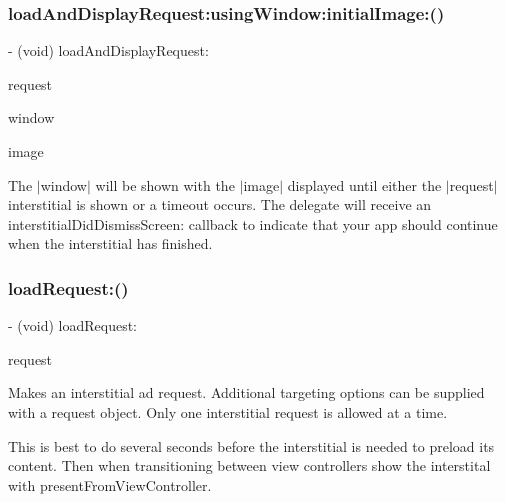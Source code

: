 \subsubsection{\texorpdfstring{load\+And\+Display\+Request\+:using\+Window\+:initial\+Image\+:()}{loadAndDisplayRequest:usingWindow:initialImage:()}}
{\footnotesize\ttfamily -\/ (void) load\+And\+Display\+Request\+: \begin{DoxyParamCaption}\item[{(\hyperlink{interfaceGADRequest}{G\+A\+D\+Request} $\ast$)}]{request }\item[{usingWindow:(U\+I\+Window $\ast$)}]{window }\item[{initialImage:(U\+I\+Image $\ast$)}]{image }\end{DoxyParamCaption}}

The $\vert$window$\vert$ will be shown with the $\vert$image$\vert$ displayed until either the $\vert$request$\vert$ interstitial is shown or a timeout occurs. The delegate will receive an interstitial\+Did\+Dismiss\+Screen\+: callback to indicate that your app should continue when the interstitial has finished. \mbox{\label{interfaceGADInterstitial_aa469fd3d2e59b8bd9d8f69cfaa28dbf3}} 
\subsubsection{\texorpdfstring{load\+Request\+:()}{loadRequest:()}}
{\footnotesize\ttfamily -\/ (void) load\+Request\+: \begin{DoxyParamCaption}\item[{(\hyperlink{interfaceGADRequest}{G\+A\+D\+Request} $\ast$)}]{request }\end{DoxyParamCaption}}

Makes an interstitial ad request. Additional targeting options can be supplied with a request object. Only one interstitial request is allowed at a time.

This is best to do several seconds before the interstitial is needed to preload its content. Then when transitioning between view controllers show the interstital with present\+From\+View\+Controller. \mbox{\label{interfaceGADInterstitial_ac002c3a84433c3e56e4cc356bcfbbd91}} 
